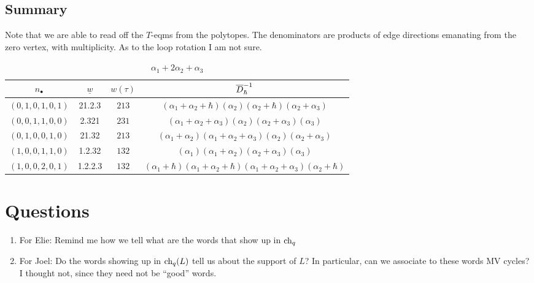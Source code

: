 \documentclass[11pt]{article}
\begin{document}
\subsection*{Summary}
Note that we are able to read off the $T$-eqms from the polytopes. The denominators are products of edge directions emanating from the zero vertex, with multiplicity. As to the loop rotation I am not sure. 
%   
\begin{table}[h]
    \small
    \begin{tabular}{cccc}
        $n_\bullet$ & {\color{blue}$\underline{w}$} & $w(\tau)$ & $\overline{D}_\hbar^{-1}$ \\
        \hline 
        $(0,1,0,1,0,1)$ & 21.2.3 & $213$ & ${(\alpha_1 + \alpha_2 + \hbar) (\alpha_2) (\alpha_2 + \hbar) (\alpha_2 + \alpha_3)}$ \\
        $(0,0,1,1,0,0)$ & 2.321 & $231$ & ${(\alpha_1 + \alpha_2 + \alpha_3)(\alpha_2)(\alpha_2 + \alpha_3)(\alpha_3)}$ \\
        $(0,1,0,0,1,0)$ & 21.32 & $213$ & ${(\alpha_1 + \alpha_2)(\alpha_1 + \alpha_2 + \alpha_3)(\alpha_2)(\alpha_2 + \alpha_3)}$ \\
        $(1,0,0,1,1,0)$ & 1.2.32 & $132$ & ${(\alpha_1)(\alpha_1 + \alpha_2)(\alpha_2 + \alpha_3)(\alpha_3)}$ \\
        $(1,0,0,2,0,1)$ & 1.2.2.3 & $132$ & ${(\alpha_1 + \hbar)(\alpha_1 + \alpha_2 + \hbar)(\alpha_1 + \alpha_2 + \alpha_3)(\alpha_2 + \hbar)}$
    \end{tabular}
    \caption{$\alpha_1 + 2\alpha_2 + \alpha_3$}
    \label{table:ta}
    \end{table}
% 
\section*{Questions}
\begin{enumerate}
    \item For Elie: Remind me how we tell what are the words that show up in $\operatorname{ch}_q$
    \item For Joel: Do the words showing up in $\operatorname{ch}_q(L)$ tell us about the support of $L$? In particular, can we associate to these words MV cycles? I thought not, since they need not be ``good'' words.
\end{enumerate}
\end{document}
